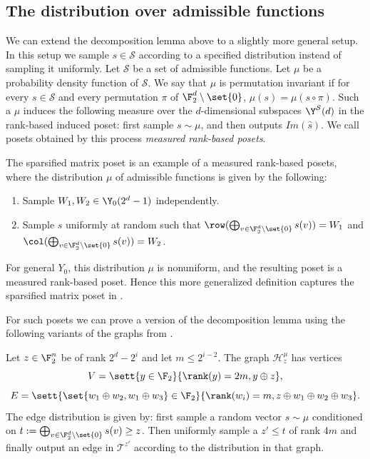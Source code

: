 \subsection{The distribution over admissible functions} \label{sec:distribution-over-admissibles}
We can extend the decomposition lemma above to a slightly more general setup. In this setup we sample \(s \in \mathcal{S}\) according to a specified distribution instead of sampling it uniformly. Let \(\mathcal{S}\) be a set of admissible functions. Let \(\mu\) be a probability density function of \(\mathcal{S}\). We say that \(\mu\) is permutation invariant if for every \(s \in \mathcal{S}\) and every permutation \(\pi\) of \(\F_2^d \setminus \set{0}\),  \(\mu(s)=\mu(s \circ \pi)\). Such a $\mu$ induces the following measure over the $d$-dimensional subspaces \(\Y^{\mathcal{S}}(d)\) in the rank-based induced poset: first sample \(s \sim \mu\), and then outputs \(Im(\widehat{s})\). We call posets obtained by this process \emph{measured rank-based posets}.

The sparsified matrix poset is an example of a measured rank-based posets, where the distribution \(\mu\) of admissible functions is given by the following: \begin{enumerate}
    \item Sample \(W_1, W_2 \in \Y_0(2^d -1)\) independently.
    \item Sample \(s\) uniformly at random such that \(\row(\bigoplus_{v \in \F_2^d \setminus \set{0}} s(v)) = W_1\) and \(\col(\bigoplus_{v \in \F_2^d \setminus \set{0}} s(v)) = W_2\).
\end{enumerate} 
For general $Y_0$, this distribution $\mu$ is nonuniform, and the resulting poset is a measured rank-based poset.
Hence this more generalized definition captures the sparsified matrix poset in .

For such posets we can prove a version of the decomposition lemma using the following variants of the graphs from .
\begin{definition}
    Let \(z \in \F_2^n\) be of rank \(2^d-2^{i}\) and let \(m \leq 2^{i-2}\). The graph \(\mathcal{H}^\mu_{z}\) has vertices
    \[V = \sett{y \in \F_2}{\rank(y)=2m, y \oplus z},\]
    \[E = \sett{\set{w_1 \oplus w_2, w_1 \oplus w_3} \in \F_2}{\rank(w_i)=m, z \oplus w_1 \oplus w_2 \oplus w_3}.\]
    The edge distribution is given by: first sample a random vector \(s \sim \mu\) conditioned on \(t:=\bigoplus_{v \in \F_2^d \setminus \set{0}}s(v) \geq z\). Then uniformly sample a \(z' \leq t\) of rank $4m$ and finally output an edge in \(\mathcal{T}^{z'}\) according to the distribution in that graph.
\end{definition}

